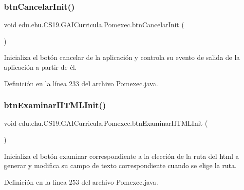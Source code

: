 \mbox{\label{a00028_adddaf261f4abfb185dbaff370be28bef}} 
\subsubsection{\texorpdfstring{btnCancelarInit()}{btnCancelarInit()}}
{\footnotesize\ttfamily void edu.\+ehu.\+C\+S19.\+G\+A\+I\+Curricula.\+Pomexec.\+btn\+Cancelar\+Init (\begin{DoxyParamCaption}{ }\end{DoxyParamCaption})}



Inicializa el botón cancelar de la aplicación y controla su evento de salida de la aplicación a partir de él. 



Definición en la línea 233 del archivo Pomexec.\+java.

\mbox{\label{a00028_aec83fb7dda0b4f2fdfc404ba2330b37a}} 
\subsubsection{\texorpdfstring{btnExaminarHTMLInit()}{btnExaminarHTMLInit()}}
{\footnotesize\ttfamily void edu.\+ehu.\+C\+S19.\+G\+A\+I\+Curricula.\+Pomexec.\+btn\+Examinar\+H\+T\+M\+L\+Init (\begin{DoxyParamCaption}{ }\end{DoxyParamCaption})}



Inicializa el botón examinar correspondiente a la elección de la ruta del html a generar y modifica su campo de texto correspondiente cuando se elige la ruta. 



Definición en la línea 253 del archivo Pomexec.\+java.

\mbox{\label{a00028_a8e25f512501551f46bb24a415036f15b}} 
